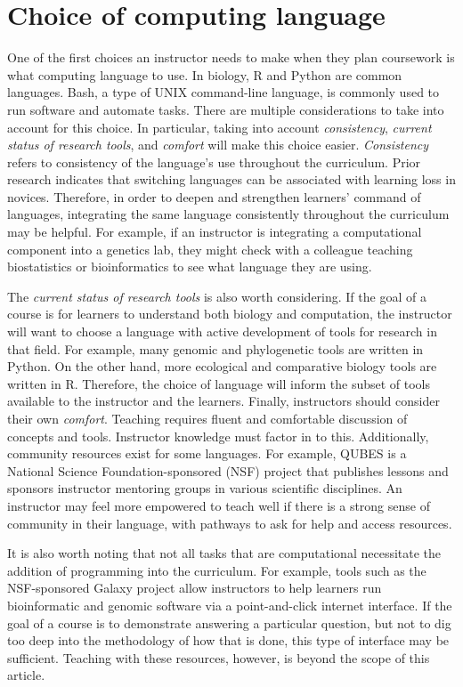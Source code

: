 \section{Choice of computing language}

One of the first choices an instructor needs to make when they plan coursework is what computing language to use.
In biology, R and Python are common languages.
Bash, a type of UNIX command-line language, is commonly used to run software and automate tasks.
There are multiple considerations to take into account for this choice.
In particular, taking into account \textit{consistency}, \textit{current status of research tools}, and \textit{comfort} will make this choice easier.
\textit{Consistency} refers to consistency of the language's use throughout the curriculum.
Prior research \cite{wu1990} indicates that switching languages can be associated with learning loss in novices.
Therefore, in order to deepen and strengthen learners' command of languages, integrating the same language consistently throughout the curriculum may be helpful.
For example, if an instructor is integrating a computational component into a genetics lab, they might check with a colleague teaching biostatistics or bioinformatics to see what language they are using.


The \textit{current status of research tools} is also worth considering. 
If the goal of a course is for learners to understand both biology and computation, the instructor will want to choose a language with active development of tools for research in that field.
For example, many genomic and phylogenetic tools are written in Python. 
On the other hand, more ecological and comparative biology tools are written in R.
Therefore, the choice of language will inform the subset of tools available to the instructor and the learners.
Finally, instructors should consider their own \textit{comfort}. 
Teaching requires fluent and comfortable discussion of concepts and tools.
Instructor knowledge must factor in to this.
Additionally, community resources exist for some languages. 
For example, QUBES is a National Science Foundation-sponsored (NSF) project that publishes lessons and sponsors instructor mentoring groups in various scientific disciplines.
An instructor may feel more empowered to teach well if there is a strong sense of community in their language, with pathways to ask for help and access resources.

It is also worth noting that not all tasks that are computational necessitate the addition of programming into the curriculum.
For example, tools such as the NSF-sponsored Galaxy project allow instructors to help learners run bioinformatic and genomic software via a point-and-click internet interface.
If the goal of a course is to demonstrate answering a particular question, but not to dig too deep into the methodology of how that is done, this type of interface may be sufficient.
Teaching with these resources, however, is beyond the scope of this article.


